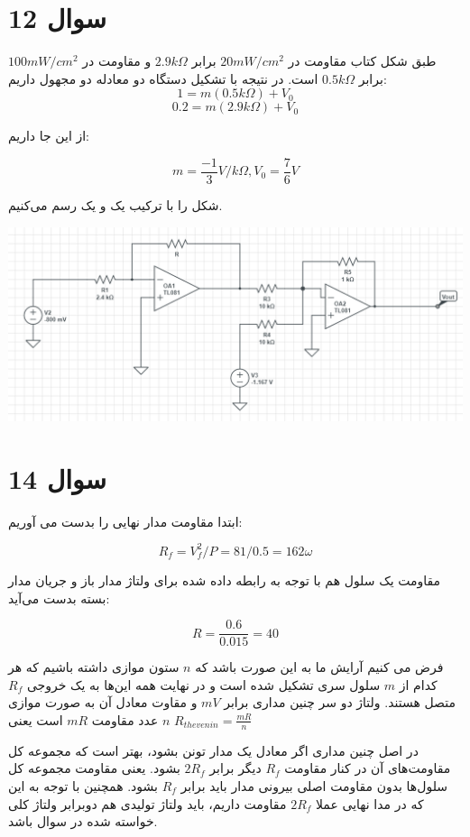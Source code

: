 \documentclass[12pt]{article}
\begin{document}
\section*{سوال 12}

طبق شکل کتاب مقاومت در $20mW/cm^2$ برابر $2.9k\Omega$ و مقاومت در
$100mW/cm^2$
برابر
$0.5k\Omega$
است. در نتیجه با تشکیل دستگاه دو معادله دو مجهول داریم:
$$1 = m(0.5k\Omega) + V_0$$
$$0.2 = m (2.9 k\Omega) + V_0$$

از این جا داریم:

$$m =\frac{-1}{3} V/k\Omega , V_0 = \frac{7}{6} V$$

شکل را با ترکیب یک  و یک  رسم می‌کنیم.



\begin{center}
	\includegraphics[width = 0.5 \textwidth]{images/12.png}
\end{center}

\newpage
\section*{سوال 14}

ابتدا مقاومت مدار نهایی را بدست می آوریم:

$$R_f = V_{f}^{2} / P = 81/0.5 = 162 \omega$$

مقاومت یک سلول هم با توجه به رابطه داده شده برای ولتاژ مدار باز و جریان مدار بسته بدست می‌آید:

$$R=\frac{0.6}{0.015}=40$$

فرض می کنیم آرایش ما به این صورت باشد که $n$ ستون موازی داشته باشیم که هر کدام از $m$ سلول سری تشکیل شده است و در نهایت همه این‌ها به یک خروجی
 $R_f$
  متصل هستند.
ولتاژ دو سر چنین مداری برابر $m V$‌ و مقاوت معادل آن به صورت موازی $n$ عدد مقاومت $mR$ است یعنی
$R_{thevenin} = \frac{mR}{n}$

در اصل چنین مداری اگر معادل یک مدار تونن بشود، بهتر است که مجموعه کل مقاومت‌های آن در کنار مقاومت $R_f$  دیگر برابر $2R_f$ بشود. یعنی مقاومت مجموعه کل سلول‌ها بدون مقاومت اصلی بیرونی مدار باید برابر $R_f$ بشود. همچنین با توجه به این که در مدا نهایی عملا $2R_f$ مقاومت داریم، باید ولتاژ تولیدی هم دوبرابر ولتاژ کلی خواسته شده در سوال باشد.
\end{document}
